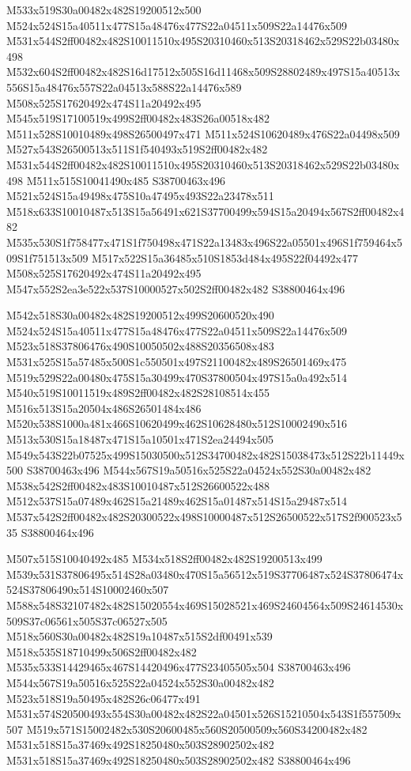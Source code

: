 \documentclass{article}
\begin{document}
\begin{multicols}{2}
M533x519S30a00482x482S19200512x500 M524x524S15a40511x477S15a48476x477S22a04511x509S22a14476x509 M531x544S2ff00482x482S10011510x495S20310460x513S20318462x529S22b03480x498 M532x604S2ff00482x482S16d17512x505S16d11468x509S28802489x497S15a40513x556S15a48476x557S22a04513x588S22a14476x589 M508x525S17620492x474S11a20492x495 M545x519S17100519x499S2ff00482x483S26a00518x482 M511x528S10010489x498S26500497x471 M511x524S10620489x476S22a04498x509 M527x543S26500513x511S1f540493x519S2ff00482x482 M531x544S2ff00482x482S10011510x495S20310460x513S20318462x529S22b03480x498 M511x515S10041490x485 S38700463x496 M521x524S15a49498x475S10a47495x493S22a23478x511 M518x633S10010487x513S15a56491x621S37700499x594S15a20494x567S2ff00482x482 M535x530S1f758477x471S1f750498x471S22a13483x496S22a05501x496S1f759464x509S1f751513x509 M517x522S15a36485x510S1853d484x495S22f04492x477 M508x525S17620492x474S11a20492x495 M547x552S2ea3e522x537S10000527x502S2ff00482x482 S38800464x496

M542x518S30a00482x482S19200512x499S20600520x490 M524x524S15a40511x477S15a48476x477S22a04511x509S22a14476x509 M523x518S37806476x490S10050502x488S20356508x483 M531x525S15a57485x500S1c550501x497S21100482x489S26501469x475 M519x529S22a00480x475S15a30499x470S37800504x497S15a0a492x514 M540x519S10011519x489S2ff00482x482S28108514x455 M516x513S15a20504x486S26501484x486 M520x538S1000a481x466S10620499x462S10628480x512S10002490x516 M513x530S15a18487x471S15a10501x471S2ea24494x505 M549x543S22b07525x499S15030500x512S34700482x482S15038473x512S22b11449x500 S38700463x496 M544x567S19a50516x525S22a04524x552S30a00482x482 M538x542S2ff00482x483S10010487x512S26600522x488 M512x537S15a07489x462S15a21489x462S15a01487x514S15a29487x514 M537x542S2ff00482x482S20300522x498S10000487x512S26500522x517S2f900523x535 S38800464x496

M507x515S10040492x485 M534x518S2ff00482x482S19200513x499 M539x531S37806495x514S28a03480x470S15a56512x519S37706487x524S37806474x524S37806490x514S10002460x507 M588x548S32107482x482S15020554x469S15028521x469S24604564x509S24614530x509S37c06561x505S37c06527x505 M518x560S30a00482x482S19a10487x515S2df00491x539 M518x535S18710499x506S2ff00482x482 M535x533S14429465x467S14420496x477S23405505x504 S38700463x496 M544x567S19a50516x525S22a04524x552S30a00482x482 M523x518S19a50495x482S26c06477x491 M531x574S20500493x554S30a00482x482S22a04501x526S15210504x543S1f557509x507 M519x571S15002482x530S20600485x560S20500509x560S34200482x482 M531x518S15a37469x492S18250480x503S28902502x482 M531x518S15a37469x492S18250480x503S28902502x482 S38800464x496


\end{multicols}
\end{document}
